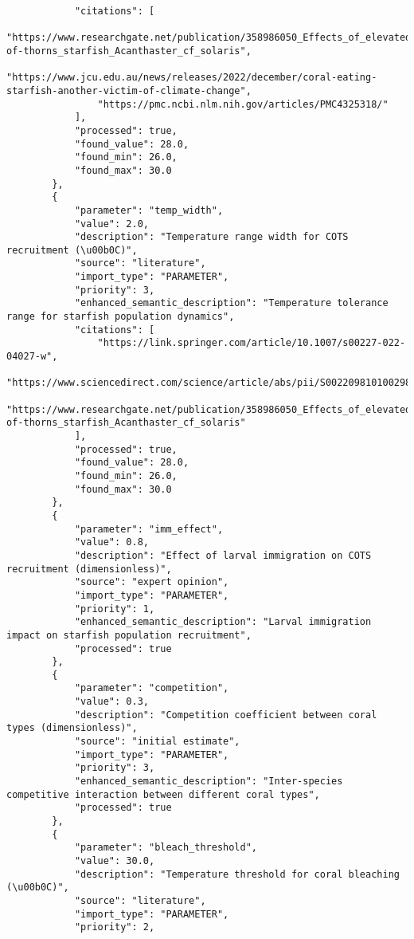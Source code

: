 \begin{lstlisting}
            "citations": [
                "https://www.researchgate.net/publication/358986050_Effects_of_elevated_temperature_on_the_performance_and_survival_of_pacific_crown-of-thorns_starfish_Acanthaster_cf_solaris",
                "https://www.jcu.edu.au/news/releases/2022/december/coral-eating-starfish-another-victim-of-climate-change",
                "https://pmc.ncbi.nlm.nih.gov/articles/PMC4325318/"
            ],
            "processed": true,
            "found_value": 28.0,
            "found_min": 26.0,
            "found_max": 30.0
        },
        {
            "parameter": "temp_width",
            "value": 2.0,
            "description": "Temperature range width for COTS recruitment (\u00b0C)",
            "source": "literature",
            "import_type": "PARAMETER",
            "priority": 3,
            "enhanced_semantic_description": "Temperature tolerance range for starfish population dynamics",
            "citations": [
                "https://link.springer.com/article/10.1007/s00227-022-04027-w",
                "https://www.sciencedirect.com/science/article/abs/pii/S0022098101002982",
                "https://www.researchgate.net/publication/358986050_Effects_of_elevated_temperature_on_the_performance_and_survival_of_pacific_crown-of-thorns_starfish_Acanthaster_cf_solaris"
            ],
            "processed": true,
            "found_value": 28.0,
            "found_min": 26.0,
            "found_max": 30.0
        },
        {
            "parameter": "imm_effect",
            "value": 0.8,
            "description": "Effect of larval immigration on COTS recruitment (dimensionless)",
            "source": "expert opinion",
            "import_type": "PARAMETER",
            "priority": 1,
            "enhanced_semantic_description": "Larval immigration impact on starfish population recruitment",
            "processed": true
        },
        {
            "parameter": "competition",
            "value": 0.3,
            "description": "Competition coefficient between coral types (dimensionless)",
            "source": "initial estimate",
            "import_type": "PARAMETER",
            "priority": 3,
            "enhanced_semantic_description": "Inter-species competitive interaction between different coral types",
            "processed": true
        },
        {
            "parameter": "bleach_threshold",
            "value": 30.0,
            "description": "Temperature threshold for coral bleaching (\u00b0C)",
            "source": "literature",
            "import_type": "PARAMETER",
            "priority": 2,

\end{lstlisting}
